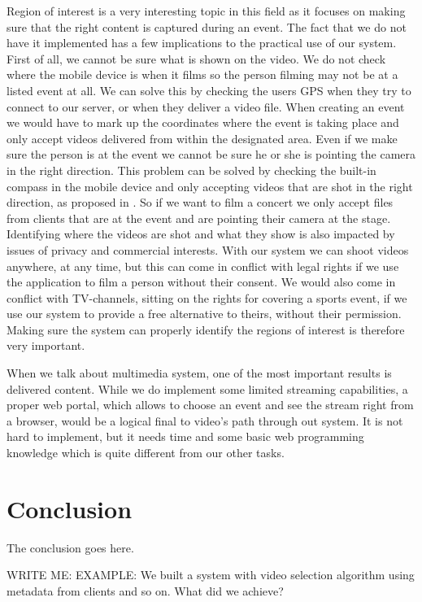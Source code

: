 \documentclass[conference]{IEEEtran}
\begin{document}
Region of interest is a very interesting topic in this field as it focuses on making sure 
that the right content is captured during an event.
The fact that we do not have it implemented has a few implications to the practical use of our system.
First of all, we cannot be sure what is shown on the video. 
We do not check where the mobile device is when it films so the person filming may not be at a listed event at all.
We can solve this by checking the users GPS when they try to connect to our server, or when they deliver a video file.
When creating an event we would have to mark up the coordinates where the event is taking place 
and only accept videos delivered from within the designated area.
Even if we make sure the person is at the event we cannot be sure he or she is pointing the camera in the right direction.
This problem can be solved by checking the built-in compass in the mobile device 
and only accepting videos that are shot in the right direction, as proposed in \cite{cricri_sensor-based_2012}.
So if we want to film a concert we only accept files from clients that are at the event and are pointing their camera at the stage. 
Identifying where the videos are shot and what they show is also impacted by issues of privacy and commercial interests. 
With our system we can shoot videos anywhere, at any time, but this can come in conflict with legal rights 
if we use the application to film a person without their consent.
We would also come in conflict with TV-channels, sitting on the rights for covering a sports event, 
if we use our system to provide a free alternative to theirs, without their permission. 
Making sure the system can properly identify the regions of interest is therefore very important.

When we talk about multimedia system, one of the most important results is delivered content. 
While we do implement some limited streaming capabilities, a proper web portal, which allows to choose an event 
and see the stream right from a browser, would be a logical final to video's path through out system.
It is not hard to implement, but it needs time and some basic web programming knowledge which is quite different from our other tasks.

\section{Conclusion}
The conclusion goes here.

WRITE ME:
EXAMPLE:
We built a system with video selection algorithm using metadata from clients and so on.
What did we achieve?
\end{document}
